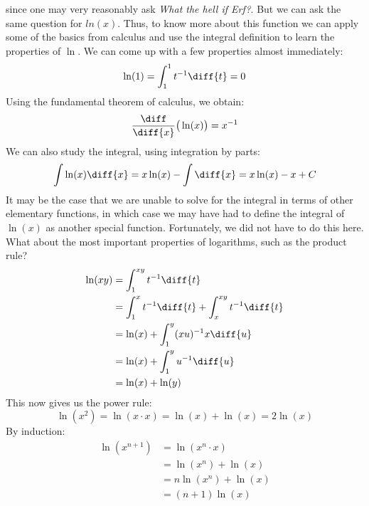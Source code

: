 \documentclass[crop=false,class=book,oneside]{standalone}
\begin{document}
        since one may very reasonably ask
        \textit{What the hell if Erf?}. But we can ask the same
        question for $ln(x)$. Thus, to know more about this function
        we can apply some of the basics from calculus and use the
        integral definition to learn the properties of $\ln$.
        We can come up with a few properties almost immediately:
        \begin{equation}
            \ln(1)=\int_{1}^{1}t^{-1}\diff{t}=0
        \end{equation}
        Using the fundamental theorem of calculus, we obtain:
        \begin{equation}
            \frac{\diff}{\diff{x}}\big(\ln(x)\big)
            =x^{-1}
        \end{equation}
        We can also study the integral, using integration by parts:
        \begin{equation}
            \int\ln(x)\diff{x}
            =x\ln(x)-\int\diff{x}
            =x\ln(x)-x+C
        \end{equation}
        It may be the case that we are unable to solve for the
        integral in terms of other elementary functions, in which
        case we may have had to define the integral of $\ln(x)$
        as another special function. Fortunately, we did not have
        to do this here. What about the most important properties
        of logarithms, such as the product rule?
        \begin{subequations}
            \begin{align}
                \ln(xy)&=\int_{1}^{xy}t^{-1}\diff{t}\\
                &=\int_{1}^{x}t^{-1}\diff{t}
                +\int_{x}^{xy}t^{-1}\diff{t}\\
                &=\ln(x)+\int_{1}^{y}(xu)^{-1}x\diff{u}\\
                &=\ln(x)+\int_{1}^{y}u^{-1}\diff{u}\\
                &=\ln(x)+\ln(y)
            \end{align}
        \end{subequations}
        This now gives us the power rule:
        \begin{equation}
            \ln(x^{2})=\ln(x\cdot{x})=\ln(x)+\ln(x)=2\ln(x)
        \end{equation}
        By induction:
        \begin{subequations}
            \begin{align}
                \ln(x^{n+1})&=\ln(x^{n}\cdot{x})\\
                &=\ln(x^{n})+\ln(x)\\
                &=n\ln(x^{n})+\ln(x)\\
                &=(n+1)\ln(x)
            \end{align}
        \end{subequations}
\end{document}
